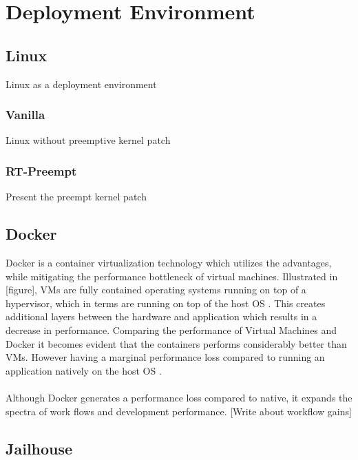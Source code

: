 \chapter{Deployment Environment}
 

\section{Linux}
Linux as a deployment environment
\subsection{Vanilla}
Linux without preemptive kernel patch
\subsection{RT-Preempt}
Present the preempt kernel patch

\section{Docker}
Docker is a container virtualization technology \cite{anderson2015docker} which utilizes the advantages, while mitigating the performance bottleneck of virtual machines. Illustrated in [figure], VMs are fully contained operating systems running on top of a hypervisor, which in terms are running on top of the host OS \cite{bernstein2014containers}. This creates additional layers between the hardware and application which results in a decrease in performance. Comparing the performance of Virtual Machines and Docker it becomes evident that the containers performs considerably better than VMs. However having a marginal performance loss compared to running an application natively on the host OS \cite{vmvscontainers}.\\\\

Although Docker generates a performance loss compared to native, it expands the spectra of work flows and development performance. [Write about workflow gains]

\section{Jailhouse}